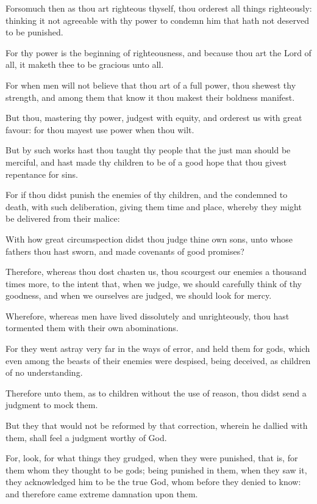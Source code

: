 {\par }{\PP {}Forsomuch then as thou art righteous thyself, thou orderest all things righteously: thinking it not agreeable with thy power to condemn him that hath not deserved to be punished.
\par }{\PP {}For thy power is the beginning of righteousness, and because thou art the Lord of all, it maketh thee to be gracious unto all.
\par }{\PP {}For when men will not believe that thou art of a full power, thou shewest thy strength, and among them that know it thou makest their boldness manifest.
\par }{\PP {}But thou, mastering thy power, judgest with equity, and orderest us with great favour: for thou mayest use power when thou wilt.
\par }{\PP {}But by such works hast thou taught thy people that the just man should be merciful, and hast made thy children to be of a good hope that thou givest repentance for sins.
\par }{\PP {}For if thou didst punish the enemies of thy children, and the condemned to death, with such deliberation, giving them time and place, whereby they might be delivered from their malice:
\par }{\PP {}With how great circumspection didst thou judge thine own sons, unto whose fathers thou hast sworn, and made covenants of good promises?
\par }{\PP {}Therefore, whereas thou dost chasten us, thou scourgest our enemies a thousand times more, to the intent that, when we judge, we should carefully think of thy goodness, and when we ourselves are judged, we should look for mercy.
\par }{\PP {}Wherefore, whereas men have lived dissolutely and unrighteously, thou hast tormented them with their own abominations.
\par }{\PP {}For they went astray very far in the ways of error, and held them for gods, which even among the beasts of their enemies were despised, being deceived, as children of no understanding.
\par }{\PP {}Therefore unto them, as to children without the use of reason, thou didst send a judgment to mock them.
\par }{\PP {}But they that would not be reformed by that correction, wherein he dallied with them, shall feel a judgment worthy of God.
\par }{\PP {}For, look, for what things they grudged, when they were punished, that is, for them whom they thought to be gods;
{} being punished in them, when they saw it, they acknowledged him to be the true God, whom before they denied to know: and therefore came extreme damnation upon them.

}
